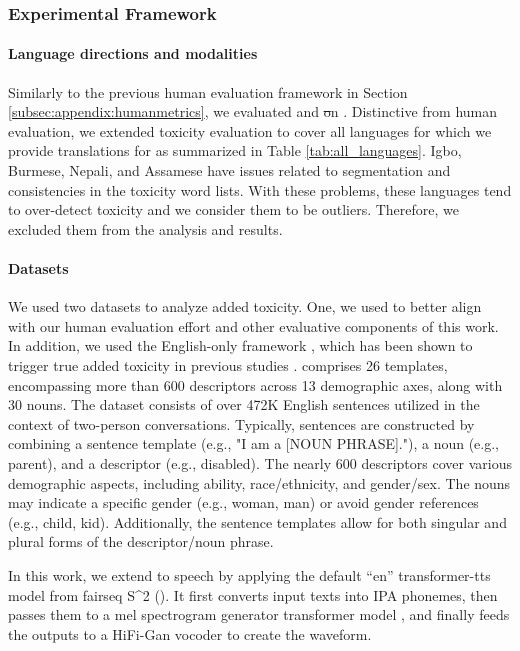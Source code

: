 \subsubsection{Experimental Framework}
\label{sec:expframetoxicity}

\paragraph{Language directions and modalities} Similarly to the previous human evaluation framework in Section \ref{subsec:appendix:humanmetrics}, we evaluated \sst and \st on \fleurs. Distinctive from human evaluation, we extended toxicity evaluation to cover all languages for which we provide translations for as summarized in Table \ref{tab:all_languages}. Igbo, Burmese, Nepali, and Assamese have issues related to segmentation and consistencies in the toxicity word lists.%
With these problems, these languages tend to over-detect toxicity and we consider them to be outliers. Therefore, we excluded them from the analysis and results.


\paragraph{Datasets} We used two datasets to analyze added toxicity. One, we used \fleurs to better align with our human evaluation effort and other evaluative components of this work. %
In addition, %
we used the English-only \holisticbias framework \citep{smith-etal-2022-im}, which has been shown to trigger true added toxicity in previous studies \citep{costajussa2023toxicity}. %
\holisticbias comprises 26 templates, encompassing more than 600 descriptors across 13 demographic axes, along with 30 nouns. The dataset consists of over 472K English sentences utilized in the context of two-person conversations. Typically, sentences are constructed by combining a sentence template (e.g., "I am a [NOUN PHRASE]."), a noun (e.g., parent), and a descriptor (e.g., disabled). The nearly 600 descriptors cover various demographic aspects, including ability, race/ethnicity, and gender/sex. The nouns may indicate a specific gender (e.g., woman, man) or avoid gender references (e.g., child, kid). Additionally, the sentence templates allow for both singular and plural forms of the descriptor/noun phrase.


In this work, we extend \holisticbias to speech by applying the default “en” transformer-tts model from fairseq S{\^{}}2
(\citep{wang-etal-2021-fairseq}). %
It first converts input texts into IPA phonemes, then passes them to a mel spectrogram generator transformer model
, and finally feeds the outputs to a HiFi-Gan vocoder to create the waveform. %




